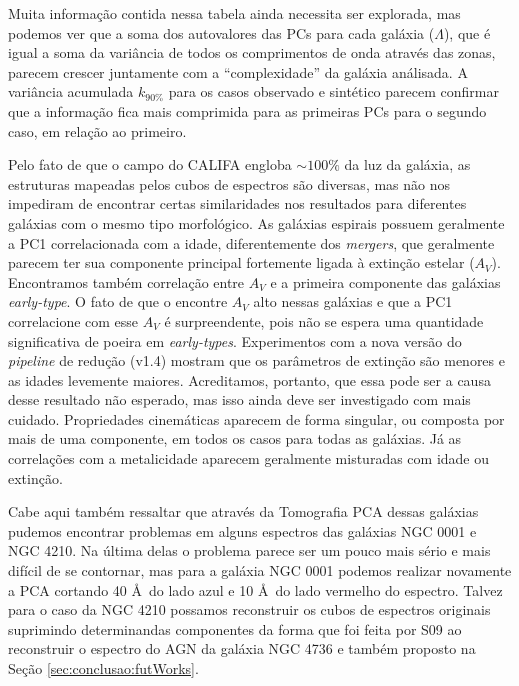 Muita informação contida nessa tabela ainda necessita ser explorada, mas podemos ver que a soma dos autovalores das PCs
para cada galáxia ($\Lambda$), que é igual a soma da variância de todos os comprimentos de onda através das zonas,
parecem crescer juntamente com a ``complexidade'' da galáxia análisada. A variância acumulada $k_{90\%}$ para os casos
observado e sintético parecem confirmar que a informação fica mais comprimida para as primeiras PCs para o segundo caso,
em relação ao primeiro.

Pelo fato de que o campo do CALIFA engloba $\sim100\%$ da luz da galáxia, as estruturas mapeadas pelos cubos de
espectros são diversas, mas não nos impediram de encontrar certas similaridades nos resultados para diferentes galáxias
com o mesmo tipo morfológico. As galáxias espirais possuem geralmente a PC1 correlacionada com a idade, diferentemente
dos {\em mergers}, que geralmente parecem ter sua componente principal fortemente ligada à extinção estelar ($A_V$).
Encontramos também correlação entre $A_V$ e a primeira componente das galáxias {\em early-type}. O fato de que o
\starlight encontre $A_V$ alto nessas galáxias e que a PC1 correlacione com esse $A_V$ é surpreendente, pois não se
espera uma quantidade significativa de poeira em {\em early-types}. Experimentos com a nova versão do {\em pipeline}
de redução (v1.4) mostram que os parâmetros de extinção são menores e as idades levemente maiores. Acreditamos,
portanto, que essa pode ser a causa desse resultado não esperado, mas isso ainda deve ser investigado com mais
cuidado. Propriedades cinemáticas aparecem de forma singular, ou composta por mais de uma componente, em todos os
casos para todas as galáxias. Já as correlações com a metalicidade aparecem geralmente misturadas com idade ou extinção.

Cabe aqui também ressaltar que através da Tomografia PCA dessas galáxias pudemos encontrar problemas em alguns espectros
das galáxias NGC 0001 e NGC 4210. Na última delas o problema parece ser um pouco mais sério e mais difícil de se
contornar, mas para a galáxia NGC 0001 podemos realizar novamente a PCA cortando 40 \AA\ do lado azul e 10 \AA\ do lado
vermelho do espectro. Talvez para o caso da NGC 4210 possamos reconstruir os cubos de espectros originais suprimindo
determinandas componentes da forma que foi feita por S09 ao reconstruir o espectro do AGN da galáxia NGC 4736 e também
proposto na Seção \ref{sec:conclusao:futWorks}.

